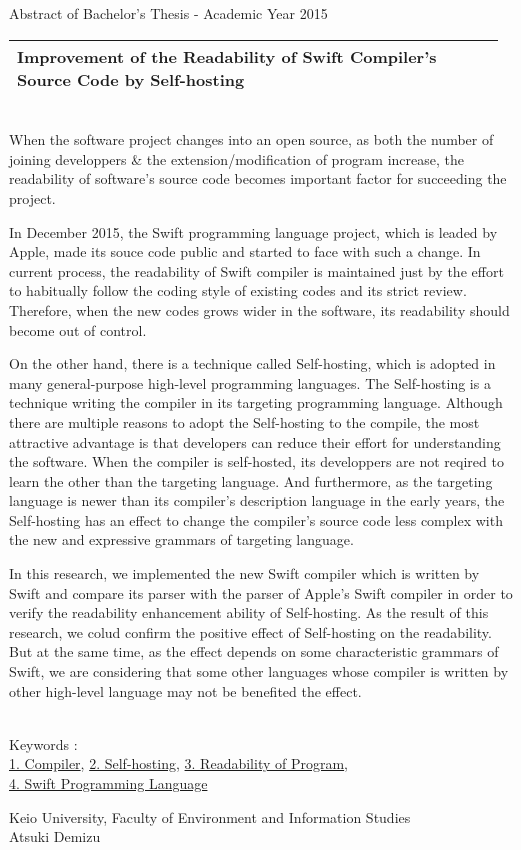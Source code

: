 Abstract of Bachelor's Thesis - Academic Year 2015
\begin{center}
\begin{large}
\begin{tabular}{|p{0.97\linewidth}|}
    \hline
    Improvement of the Readability of Swift Compiler's Source Code by Self-hosting\\
    \hline
\end{tabular}
\end{large}
\end{center}

~ \\

When the software project changes into an open source, as both the number of joining developpers \& the extension/modification of program increase, the readability of software's source code becomes important factor for succeeding the project.

In December 2015, the Swift programming language project, which is leaded by Apple, made its souce code public and started to face with such a change.
In current process, the readability of Swift compiler is maintained just by the effort to habitually follow the coding style of existing codes and its strict review.
Therefore, when the new codes grows wider in the software, its readability should become out of control.

On the other hand, there is a technique called Self-hosting, which is adopted in many general-purpose high-level programming languages.
The Self-hosting is a technique writing the compiler in its targeting programming language.
Although there are multiple reasons to adopt the Self-hosting to the compile, the most attractive advantage is that developers can reduce their effort for understanding the software.
When the compiler is self-hosted, its developpers are not reqired to learn the other than the targeting language.
And furthermore, as the targeting language is newer than its compiler's description language in the early years, the Self-hosting has an effect to change the compiler's source code less complex with the new and expressive grammars of targeting language.

In this research, we implemented the new Swift compiler which is written by Swift and compare its parser with the parser of Apple's Swift compiler in order to verify the readability enhancement ability of Self-hosting.
As the result of this research, we colud confirm the positive effect of Self-hosting on the readability.
But at the same time, as the effect depends on some characteristic grammars of Swift, we are considering that some other languages whose compiler is written by other high-level language may not be benefited the effect.

~ \\
Keywords : \\
\underline{1. Compiler},
\underline{2. Self-hosting},
\underline{3. Readability of Program},\\
\underline{4. Swift Programming Language}
\begin{flushright}
Keio University, Faculty of Environment and Information Studies\\
Atsuki Demizu
\end{flushright}
